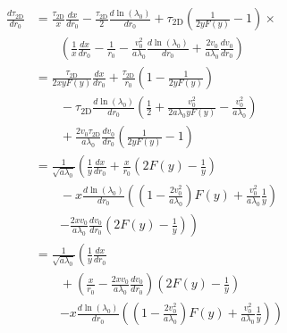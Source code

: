 \documentclass[aps,prl,twocolumn,showpacs,superscriptaddress,groupedaddress]{revtex4-1}  %
\begin{document}
\begin{align}
  \frac{d \tau_\text{2D}}{d r_0} &= \frac{\tau_\text{2D}}{x} \frac{dx}{dr_0}  - \frac{\tau_\text{2D}}{2}\frac{d\ln(\lambda_0)}{d r_0}  +  \tau_\text{2D}\left(\frac{1}{2 y F(y)} - 1\right)\times\nonumber\\
                                                &\quad\quad\left(\frac{1}{x} \frac{d x}{d r_0} - \frac{1}{r_0}  -  \frac{v_0^2}{a\lambda_0} \frac{d\ln(\lambda_0)}{d r_0} +   \frac{2 v_0}{a\lambda_0}\frac{d v_0}{d r_0}\right)\nonumber\\
                                                &= \frac{\tau_\text{2D}}{2 x y F(y)} \frac{dx}{dr_0} + \frac{\tau_\text{2D}}{r_0}\left(1 - \frac{1}{2 y F(y)}\right)\nonumber\\
                                                &\quad\quad -  \tau_\text{2D}\frac{d\ln(\lambda_0)}{d r_0} \left(\frac{1}{2} + \frac{v_0^2}{2 a \lambda_0 y F(y)} - \frac{v_0^2}{a \lambda_0}\right)\nonumber\\
                                                &\quad\quad + \frac{2 v_0 \tau_\text{2D}}{a\lambda_0}\frac{d v_0}{d r_0} \left(\frac{1}{2 y F(y)} - 1\right)\nonumber\\
                                                &=\frac{1}{\sqrt{a \lambda_0}}\left(\frac{1}{ y} \frac{dx}{dr_0} + \frac{x}{r_0}\left(2 F(y) - \frac{1}{y}\right)\right.\nonumber\\
                                                &\quad\quad -  x \frac{d\ln(\lambda_0)}{d r_0} \left(\left(1 -  \frac{2 v_0^2}{a \lambda_0}\right)F(y)  + \frac{v_0^2}{a \lambda_0}\frac{1}{y} \right)\nonumber\\
                                                &\quad\quad \left. - \frac{2 x v_0}{a\lambda_0}\frac{d v_0}{d r_0} \left(2 F(y) - \frac{1}{y}\right)\right)\nonumber\\
                                                &=\frac{1}{\sqrt{a \lambda_0}}\left(\frac{1}{ y} \frac{dx}{dr_0}\right.\nonumber\\
                                                &\quad\quad + \left(\frac{x}{r_0}- \frac{2 x v_0}{a\lambda_0}\frac{d v_0}{d r_0}\right) \left(2 F(y) - \frac{1}{y}\right)\nonumber\\
                                                &\quad\quad \left.-  x\frac{d\ln(\lambda_0)}{d r_0} \left(\left(1 -  \frac{2 v_0^2}{a \lambda_0}\right)F(y)  + \frac{v_0^2}{a \lambda_0}\frac{1}{y} \right)\right)\label{eq:derivative tau 2D} 
\end{align}
\end{document}
